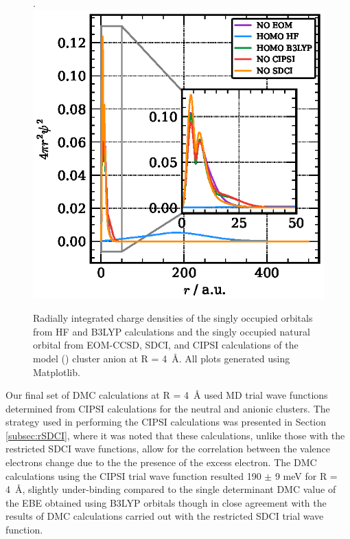 \begin{figure}
    \caption{\label{fig:orbitalsR4} Radially integrated charge densities of the singly occupied orbitals from HF and B3LYP calculations and the singly occupied natural orbital from EOM-CCSD, SDCI, and CIPSI calculations  of the model () cluster anion at R = \SI{4}{\angstrom}. All plots generated using Matplotlib.\cite{10.1109/MCSE.2007.55}}.
    \includegraphics[width=\columnwidth,keepaspectratio]{Images/chapter3/r4_orbitalr2.eps}
\end{figure}


Our final set of DMC calculations at R = \SI{4}{\angstrom} used MD trial wave functions determined from CIPSI calculations for the neutral and anionic clusters. 
The strategy used in performing the CIPSI calculations was presented in Section \ref{subsec:rSDCI}, where it was noted that these calculations, unlike those with the restricted SDCI wave functions, allow for the correlation between the valence electrons change due to the the presence of the excess electron. 
The DMC calculations using the CIPSI trial wave function resulted 190 $\pm$ 9 meV for R = \SI{4}{\angstrom}, slightly under-binding compared to the single determinant DMC value of the EBE obtained using B3LYP orbitals though in close agreement with the results of DMC calculations carried out with the restricted SDCI trial wave function.

